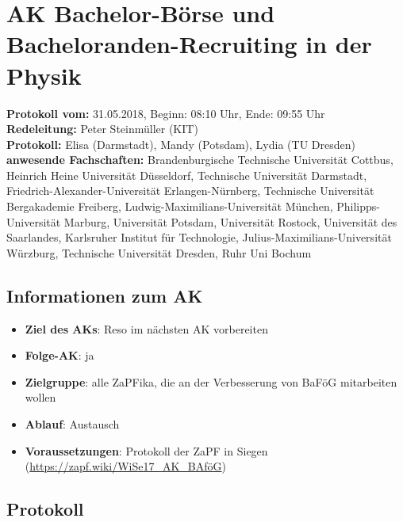 
\section{AK Bachelor-Börse und Bacheloranden-Recruiting in der Physik}

  \textbf{Protokoll vom:} 31.05.2018,
  Beginn: 08:10 Uhr,
  Ende: 09:55 Uhr \\
  \textbf{Redeleitung:} Peter Steinmüller (KIT) \\
  \textbf{Protokoll:} Elisa (Darmstadt), Mandy (Potsdam), Lydia (TU Dresden) \\
  \textbf{anwesende Fachschaften:} Brandenburgische Technische Universität Cottbus, Heinrich Heine Universität Düsseldorf, Technische Universität Darmstadt, Friedrich-Alexander-Universität Erlangen-Nürnberg, Technische Universität Bergakademie Freiberg, Ludwig-Maximilians-Universität München, Philipps-Universität Marburg, Universität Potsdam, Universität Rostock, Universität des Saarlandes, Karlsruher Institut für Technologie, Julius-Maximilians-Universität Würzburg, Technische Universität Dresden, Ruhr Uni Bochum

  \subsection*{Informationen zum AK}
    \begin{itemize}
      \item \textbf{Ziel des AKs}: Reso im nächsten AK vorbereiten
      \item \textbf{Folge-AK}: ja
      \item \textbf{Zielgruppe}: alle ZaPFika, die an der Verbesserung von BaFöG mitarbeiten wollen
      \item \textbf{Ablauf}: Austausch
      \item \textbf{Voraussetzungen}: Protokoll der ZaPF in Siegen (\url{https://zapf.wiki/WiSe17_AK_BAföG})
    \end{itemize}

  \subsection*{Protokoll}
